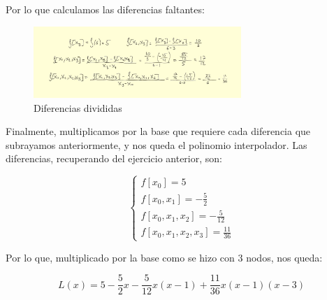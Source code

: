 \documentclass{article}
\begin{document}
Por lo que calculamos las diferencias faltantes:

\begin{figure}[h]
  \center
  \includegraphics[width=0.7\textwidth]{src/newton2.jpg}
  \caption{Diferencias divididas}
\end{figure}

Finalmente, multiplicamos por la base que requiere cada diferencia que subrayamos anteriormente, y nos queda el polinomio interpolador. Las diferencias, recuperando del ejercicio anterior, son:

\begin{equation}
\begin{cases}
f[x_0] = 5 \\
f[x_0, x_1] = -\frac{5}{2} \\
f[x_0, x_1, x_2] = -\frac{5}{12} \\
f[x_0, x_1, x_2, x_3] = \frac{11}{36}
\end{cases}
\end{equation}

Por lo que, multiplicado por la base como se hizo con 3 nodos, nos queda:

\begin{equation}
L(x) = 5 - \frac{5}{2}x - \frac{5}{12}x(x - 1) + \frac{11}{36}x(x - 1)(x - 3)
\end{equation}
\end{document}
